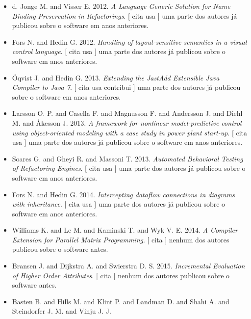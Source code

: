 \begin{itemize}
      [
          cita
          usa
      ]
uma parte dos autores já publicou sobre o software em anos anteriores.
\item d. Jonge M. and Visser E.
      2012.
        \textit{ A Language Generic Solution for Name Binding Preservation in Refactorings}.
      [
          cita
          usa
      ]
uma parte dos autores já publicou sobre o software em anos anteriores.
\item Fors N. and Hedin G.
      2012.
        \textit{ Handling of layout-sensitive semantics in a visual control language}.
      [
          cita
          usa
      ]
uma parte dos autores já publicou sobre o software em anos anteriores.
\item \"{O}qvist J. and Hedin G.
      2013.
        \textit{ Extending the JastAdd Extensible Java Compiler to Java 7}.
      [
          cita
          usa
          contribui
      ]
uma parte dos autores já publicou sobre o software em anos anteriores.
\item Larsson O. P. and Casella F. and Magnusson F. and Andersson J. and Diehl M. and Åkesson J.
      2013.
        \textit{ A framework for nonlinear model-predictive control using object-oriented modeling with a case study in power plant start-up}.
      [
          cita
          usa
      ]
uma parte dos autores já publicou sobre o software em anos anteriores.
\item Soares G. and Gheyi R. and Massoni T.
      2013.
        \textit{ Automated Behavioral Testing of Refactoring Engines}.
      [
          cita
          usa
      ]
uma parte dos autores já publicou sobre o software em anos anteriores.
\item Fors N. and Hedin G.
      2014.
        \textit{ Intercepting dataflow connections in diagrams with inheritance}.
      [
          cita
          usa
      ]
uma parte dos autores já publicou sobre o software em anos anteriores.
\item Williams K. and Le M. and Kaminski T. and Wyk V. E.
      2014.
        \textit{ A Compiler Extension for Parallel Matrix Programming}.
      [
          cita
      ]
nenhum dos autores publicou sobre o software antes.
\item Bransen J. and Dijkstra A. and Swierstra D. S.
      2015.
        \textit{ Incremental Evaluation of Higher Order Attributes}.
      [
          cita
      ]
nenhum dos autores publicou sobre o software antes.
\item Basten B. and Hills M. and Klint P. and Landman D. and Shahi A. and Steindorfer J. M. and Vinju J. J.

\end{itemize}
